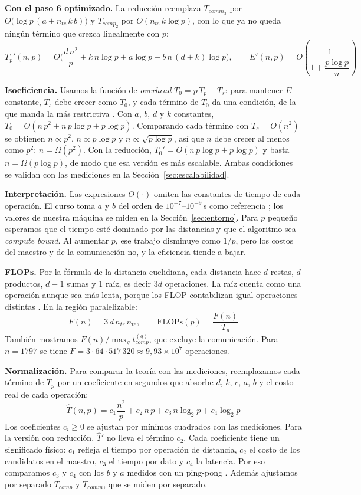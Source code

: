 \documentclass[11pt,a4paper]{article}
\newcommand{\ntr}{n_{tr}}
\newcommand{\nte}{n_{te}}
\newcommand{\tcomm}[1]{T_{comm_{#1}}}
\newcommand{\tcomp}[1]{T_{comp_{#1}}}
\begin{document}
\textbf{Con el paso 6 optimizado.} La reducción reemplaza $\tcomm{3}$ por $O\big(\log p\,(a+\nte\, k\, b)\big)$ y $\tcomp{2}$ por $O(\nte\, k\log p)$, con lo que ya no queda ningún término que crezca linealmente con $p$:
\[
T_p'(n,p)=O\Big(\frac{d\,n^2}{p}+k\,n\log p+a\log p+b\,n\,(d+k)\log p\Big),
\qquad
E'(n,p)=O\left(\frac{1}{1+\dfrac{p\log p}{n}}\right)
\]

\textbf{Isoeficiencia.} Usamos la función de \textit{overhead} $T_0=p\,T_p-T_s$: para mantener $E$ constante, $T_s$ debe crecer como $T_0$, y cada término de $T_0$ da una condición, de la que manda la más restrictiva \cite{slides}. Con $a$, $b$, $d$ y $k$ constantes, $T_0=O(n\,p^2+n\,p\log p+p\log p)$. Comparando cada término con $T_s=O(n^2)$ se obtienen $n\propto p^2$, $n\propto p\log p$ y $n\propto\sqrt{p\log p}$, así que $n$ debe crecer al menos como $p^2$: $n=\Omega(p^2)$. Con la reducción, $T_0'=O(n\,p\log p+p\log p)$ y basta $n=\Omega(p\log p)$, de modo que esa versión es más escalable. Ambas condiciones se validan con las mediciones en la Sección~\ref{sec:escalabilidad}.

\textbf{Interpretación.} Las expresiones $O(\cdot)$ omiten las constantes de tiempo de cada operación. El curso toma $a$ y $b$ del orden de $10^{-7}$--$10^{-9}$\,s como referencia \cite{slides}; los valores de nuestra máquina se miden en la Sección~\ref{sec:entorno}. Para $p$ pequeño esperamos que el tiempo esté dominado por las distancias y que el algoritmo sea \textit{compute bound}. Al aumentar $p$, ese trabajo disminuye como $1/p$, pero los costos del maestro y de la comunicación no, y la eficiencia tiende a bajar.

\textbf{FLOPs.} Por la fórmula de la distancia euclidiana, cada distancia hace $d$ restas, $d$ productos, $d-1$ sumas y 1 raíz, es decir $3d$ operaciones. La raíz cuenta como una operación aunque sea más lenta, porque los FLOP contabilizan igual operaciones distintas \cite{slides}. En la región paralelizable:
\[
F(n)=3\,d\,\ntr\,\nte,\qquad \text{FLOPs}(p)=\frac{F(n)}{T_p}
\]
También mostramos $F(n)/\max_q t^{(q)}_{comp}$, que excluye la comunicación.
Para $n=1797$ se tiene $F=3\cdot 64\cdot 517\,320\approx 9{,}93\times 10^{7}$ operaciones.

\textbf{Normalización.} Para comparar la teoría con las mediciones, reemplazamos cada término de $T_p$ por un coeficiente en segundos que absorbe $d$, $k$, $c$, $a$, $b$ y el costo real de cada operación:
\[
\hat T(n,p)=c_1\frac{n^2}{p}+c_2\,n\,p+c_3\,n\log_2 p+c_4\log_2 p
\]
Los coeficientes $c_i\ge 0$ se ajustan por mínimos cuadrados con las mediciones. Para la versión con reducción, $\hat T'$ no lleva el término $c_2$. Cada coeficiente tiene un significado físico: $c_1$ refleja el tiempo por operación de distancia, $c_2$ el costo de los candidatos en el maestro, $c_3$ el tiempo por dato y $c_4$ la latencia. Por eso comparamos $c_3$ y $c_4$ con los $b$ y $a$ medidos con un ping-pong \cite{slides}. Además ajustamos por separado $T_{comp}$ y $T_{comm}$, que se miden por separado.
\end{document}
